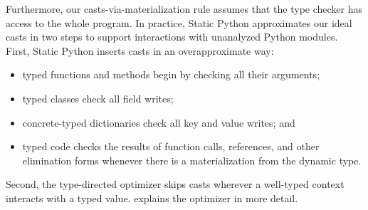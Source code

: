 \documentclass[english,cleveref,submission]{programming}
\newcommand{\SP}{Static Python}
\begin{document}
Furthermore, our casts-via-materialization rule assumes that the
type checker has access to the whole program.
In practice, \SP{} approximates our ideal casts in two steps
to support interactions with unanalyzed Python modules.
First, \SP{} inserts casts in an overapproximate way:
\begin{itemize}
  \item
    typed functions and methods begin by checking all their arguments;
  \item
    typed classes check all field writes;
  \item
    concrete-typed dictionaries check all key and value writes; and
  \item
    typed code checks the results of function calls, references, and other elimination forms
    whenever there is a materialization from the dynamic type.
\end{itemize}
Second, the type-directed optimizer skips casts wherever a well-typed context
interacts with a typed value.
 explains the optimizer in more detail.
\end{document}
